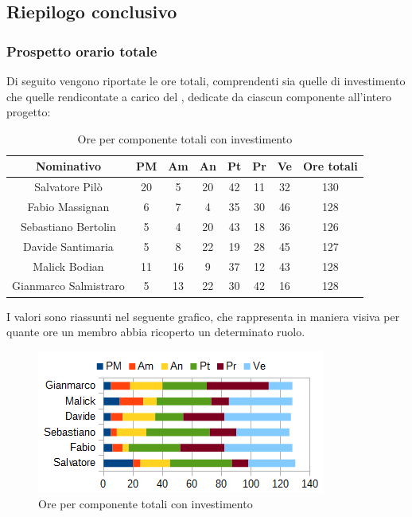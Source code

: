 	\subsection{Riepilogo conclusivo}
		\subsubsection{Prospetto orario totale}
		Di seguito vengono riportate le ore totali, comprendenti sia quelle di investimento che quelle rendicontate a carico del , dedicate da ciascun componente all'intero progetto: \\
		\begin{table}[H]
		\centering
		\begin{tabular}{|c|c|c|c|c|c|c|c|}
			\hline
			\textbf{Nominativo}		& \textbf{PM}	& \textbf{Am}	& \textbf{An}	& \textbf{Pt}	& \textbf{Pr}	& \textbf{Ve}	& \textbf{Ore totali}     \\
			\hline
			Salvatore Pilò			& 20	& 5		& 20	& 42	& 11	& 32	& 130 \\
			Fabio Massignan			& 6		& 7		& 4		& 35	& 30	& 46	& 128 \\
			Sebastiano Bertolin		& 5		& 4		& 20	& 43	& 18	& 36	& 126 \\
			Davide Santimaria		& 5		& 8		& 22	& 19	& 28	& 45	& 127 \\
			Malick Bodian			& 11	& 16	& 9		& 37	& 12	& 43	& 128 \\
			Gianmarco Salmistraro	& 5		& 13	& 22	& 30	& 42	& 16	& 128 \\
			\hline
		\end{tabular}
		\caption{Ore per componente totali con investimento}
		\end{table}
		I valori sono riassunti nel seguente grafico, che rappresenta in maniera visiva per quante ore un membro abbia ricoperto un determinato ruolo. \\
		\begin{figure}[H]
			\centering
			\includegraphics[scale=1]{immagini/grafici/riepilogo_conclusivo-barra.png}
			\caption{Ore per componente totali con investimento}
		\end{figure}
